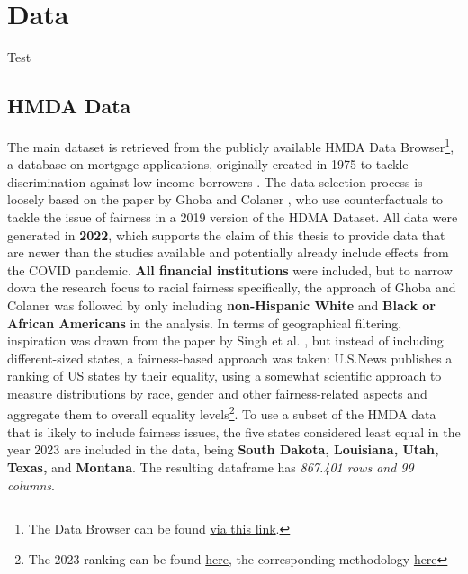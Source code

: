 \section{Data}\label{sec:Data}

Test

\subsection{HMDA Data}\label{subsec:HMDA_Data}

The main dataset is retrieved from the publicly available HMDA Data Browser\footnote{The Data Browser can be found \href{https://ffiec.cfpb.gov/data-browser/data/2022?category=states}{via this link}.}, a database on mortgage applications, originally created in 1975 to tackle discrimination against low-income borrowers \parencite{Bogen2020}. 
The data selection process is loosely based on the paper by Ghoba and Colaner \parencite{Ghoba}, who use counterfactuals to tackle the issue of fairness in a 2019 version of the HDMA Dataset. 
All data were generated in \textbf{2022}, which supports the claim of this thesis to provide data that are newer than the studies available and potentially already include effects from the COVID pandemic. \textbf{All financial institutions} were included, but to narrow down the research focus to racial fairness specifically, the approach of Ghoba and Colaner was followed by only including \textbf{non-Hispanic White} and \textbf{Black or African Americans} in the analysis. 
In terms of geographical filtering, inspiration was drawn from the paper by Singh et al. \parencite{Singh2022}, but instead of including different-sized states, a fairness-based approach was taken: 
U.S.News publishes a ranking of US states by their equality, using a somewhat scientific approach to measure distributions by race, gender and other fairness-related aspects and aggregate them to overall equality levels\footnote{The 2023 ranking can be found \href{https://www.usnews.com/news/best-states/rankings/opportunity/equality?sort=rank-desc}{here}, the corresponding methodology \href{https://www.usnews.com/news/best-states/articles/methodology}{here}}. 
To use a subset of the HMDA data that is likely to include fairness issues, the five states considered least equal in the year 2023 are included in the data, being \textbf{South Dakota, Louisiana, Utah, Texas,} and \textbf{Montana}. The resulting dataframe has \textit{867.401 rows and 99 columns}.

